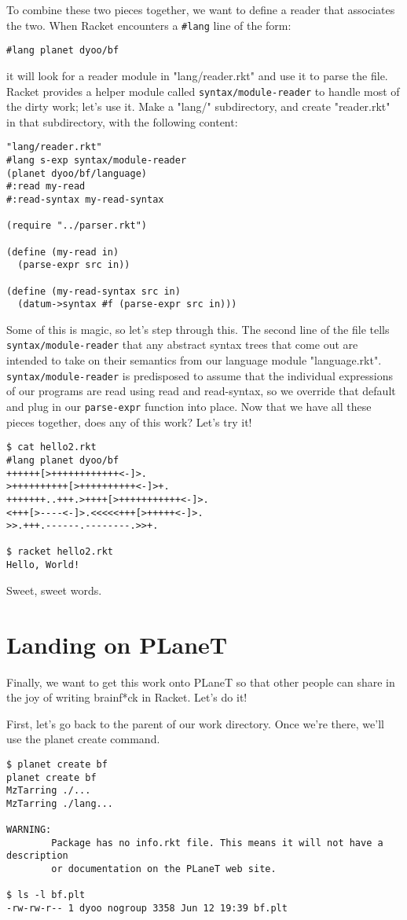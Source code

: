\documentclass{article}
\begin{document}
To combine these two pieces together, we want to define a reader that
associates the two. When Racket encounters a \verb+#lang+ line of the
form:
\begin{verbatim}
#lang planet dyoo/bf
\end{verbatim}
it will look for a reader module in "lang/reader.rkt" and use it to
parse the file.  Racket provides a helper module called
\verb|syntax/module-reader| to handle most of the dirty work; let's use
it. Make a "lang/" subdirectory, and create "reader.rkt" in that
subdirectory, with the following content:
\begin{verbatim}
"lang/reader.rkt"
#lang s-exp syntax/module-reader
(planet dyoo/bf/language)
#:read my-read
#:read-syntax my-read-syntax
 
(require "../parser.rkt")
 
(define (my-read in)
  (parse-expr src in))
 
(define (my-read-syntax src in)
  (datum->syntax #f (parse-expr src in)))
\end{verbatim}
Some of this is magic, so let's step through this. The second line of
the file tells \verb|syntax/module-reader| that any abstract syntax trees
that come out are intended to take on their semantics from our
language module "language.rkt". \verb|syntax/module-reader| is predisposed to
assume that the individual expressions of our programs are read using read and read-syntax, so we
override that default and plug in our \verb|parse-expr| function into place.
Now that we have all these pieces together, does any of this work?
Let's try it!
\begin{verbatim}
$ cat hello2.rkt
#lang planet dyoo/bf
++++++[>++++++++++++<-]>.
>++++++++++[>++++++++++<-]>+.
+++++++..+++.>++++[>+++++++++++<-]>.
<+++[>----<-]>.<<<<<+++[>+++++<-]>.
>>.+++.------.--------.>>+.
 
$ racket hello2.rkt
Hello, World!
\end{verbatim}
Sweet, sweet words.

\section{Landing on PLaneT}
Finally, we want to get this work onto PLaneT so that other people can share in the joy of writing brainf*ck in Racket. Let's do it!

First, let's go back to the parent of our work directory. Once we're there, we'll use the planet create command.
\begin{verbatim}
$ planet create bf
planet create bf
MzTarring ./...
MzTarring ./lang...
 
WARNING:
        Package has no info.rkt file. This means it will not have a description
        or documentation on the PLaneT web site.
 
$ ls -l bf.plt
-rw-rw-r-- 1 dyoo nogroup 3358 Jun 12 19:39 bf.plt
\end{verbatim}
\end{document}
